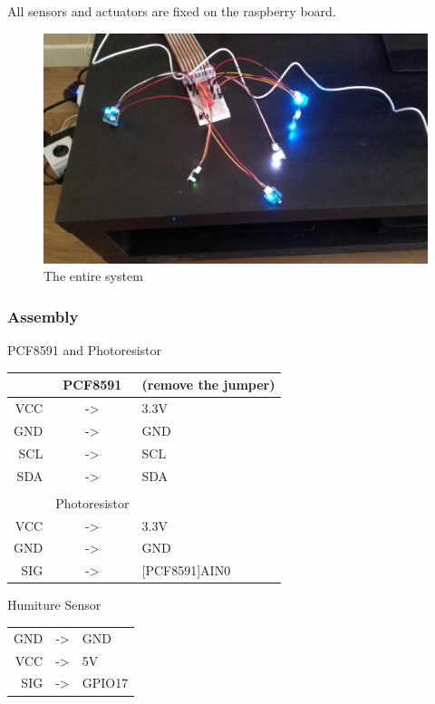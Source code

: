 \documentclass[10pt]{article}
\begin{document}
All sensors and actuators are fixed on the raspberry board.

\begin{figure}[H]
  \centering
  \includegraphics[width=\textwidth]{../imgs/entireSystem.jpg}
  \caption{\label{entireSystem}The entire system}
\end{figure}

\subsubsection{Assembly}
PCF8591 and Photoresistor
\begin{table}[H]
  \centering
\begin{tabular}{r c l}
  & PCF8591 & (remove the jumper)\\
  \hline
  VCC &->& 3.3V \\
  GND &->& GND \\
  SCL &->& SCL \\
  SDA &->& SDA \\
  \\
  & Photoresistor & \\
  \hline
  VCC &->& 3.3V \\
  GND &->& GND \\
  SIG &->& [PCF8591]AIN0 \\
\end{tabular}
\end{table}

Humiture Sensor

\begin{table}[H]
  \centering
\begin{tabular}{rcl}
  GND &->& GND \\
  VCC &->& 5V \\
  SIG &->& GPIO17 \\
\end{tabular}
\end{table}
\end{document}
